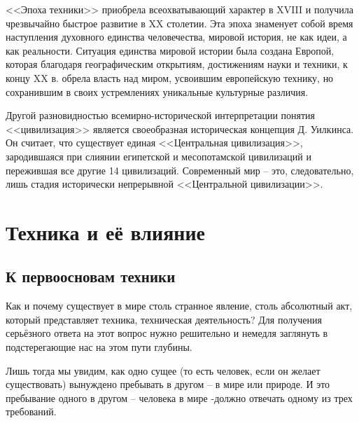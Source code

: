 <<Эпоха техники>> приобрела всеохватывающий характер в XVIII и получила 
чрезвычайно быстрое развитие в XX столетии. Эта эпоха знаменует собой время 
наступления духовного единства человечества, мировой история, не как идеи, а 
как реальности. Ситуация единства мировой истории была создана Европой, 
которая благодаря географическим открытиям, достижениям науки и техники, к 
концу XX в. обрела власть над миром, усвоившим европейскую технику, но 
сохранившим в своих устремлениях уникальные культурные различия.

Другой разновидностью всемирно-исторической интерпретации понятия 
<<цивилизация>> является своеобразная историческая концепция Д. Уилкинса. Он 
считает, что существует единая <<Центральная цивилизация>>, зародившаяся при 
слиянии египетской и месопотамской цивилизаций и пережившая все другие 14 
цивилизаций. Современный мир -- это, следовательно, лишь стадия исторически 
непрерывной <<Центральной цивилизации>>.\cite{net:01}

\section{Техника и её влияние}

\subsection{К первоосновам техники}

Как и почему существует в мире столь странное явление, столь абсолютный акт, 
который представляет техника, техническая деятельность? Для получения 
серьёзного ответа на этот вопрос нужно решительно и немедля заглянуть в 
подстерегающие нас на этом пути глубины.

Лишь тогда мы увидим, как одно сущее (то есть человек, если он желает 
существовать) вынуждено пребывать в другом -- в мире или природе. И это 
пребывание одного в другом -- человека в мире -должно отвечать одному из трех 
требований.


